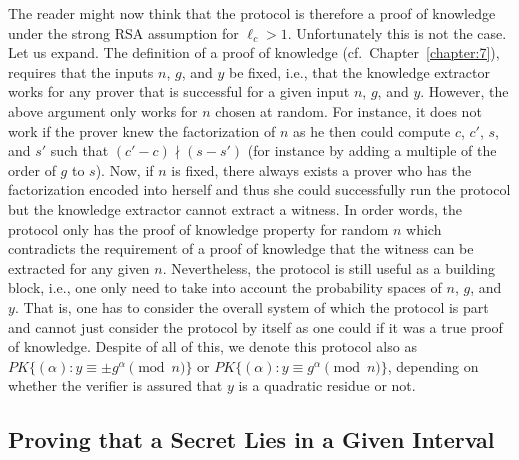 The reader might now think that the protocol is therefore a proof of knowledge under
the strong RSA assumption for $\ell_c > 1$.
Unfortunately this is not the case.
Let us expand.
The definition of a proof of knowledge
(cf.~Chapter~\ref{chapter:7}), 
requires that the inputs $n$, $g$, and $y$ be fixed, i.e., that
the knowledge extractor works for any prover that is successful for a 
given input $n$, $g$, and $y$.
However, the above argument only works for $n$ chosen at random.
For instance, it does not work if the prover knew the factorization of 
$n$ as he then could compute $c$, $c'$, $s$, and $s'$ such that
$(c'-c) \nmid (s-s')$ (for instance by adding a multiple of the order of 
$g$ to $s$).
Now, if $n$ is fixed, there always exists a prover who has the factorization 
encoded into herself and thus she could successfully run the protocol but the
knowledge extractor cannot extract a witness.
In order words, the protocol only has the proof of knowledge property 
for random $n$ which contradicts the requirement of a proof of knowledge that 
the witness can be extracted for any given $n$.
Nevertheless, the protocol is still useful as a building block, i.e., 
one only need to take into account the probability spaces of $n$, $g$, and $y$.
That is, one has to consider the overall system of which the protocol is part and cannot just
consider the protocol by itself as one could if it was a true proof of knowledge.
Despite of all of this, we denote this protocol also as 
$\textit{PK}\{(\alpha): y \equiv \pm g^\alpha \pmod{n}\}$ or
$\textit{PK}\{(\alpha): y \equiv g^\alpha \pmod{n}\}$, depending on whether the verifier
is assured that $y$ is a quadratic residue or not.

\subsection{Proving that a Secret Lies in a Given Interval}
\label{Proving that a Secret Lies in a Given Interval}

